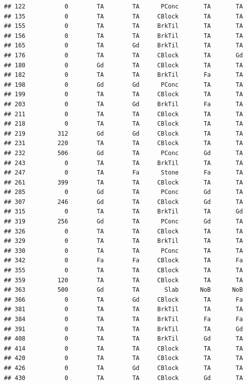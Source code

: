 \documentclass[]{article}
\begin{document}
\begin{verbatim}
## 122           0        TA        TA      PConc       TA       TA
## 135           0        TA        TA     CBlock       TA       TA
## 155           0        TA        TA     BrkTil       TA       TA
## 156           0        TA        TA     BrkTil       TA       TA
## 165           0        TA        Gd     BrkTil       TA       TA
## 176           0        TA        TA     CBlock       TA       Gd
## 180           0        Gd        TA     CBlock       TA       TA
## 182           0        TA        TA     BrkTil       Fa       TA
## 198           0        Gd        Gd      PConc       TA       TA
## 199           0        TA        TA     CBlock       TA       TA
## 203           0        TA        Gd     BrkTil       Fa       TA
## 211           0        TA        TA     CBlock       TA       TA
## 218           0        TA        TA     CBlock       TA       TA
## 219         312        Gd        Gd     CBlock       TA       TA
## 231         220        TA        TA     CBlock       TA       TA
## 232         506        Gd        TA      PConc       Gd       TA
## 243           0        TA        TA     BrkTil       TA       TA
## 247           0        TA        Fa      Stone       Fa       TA
## 261         399        TA        TA     CBlock       TA       TA
## 285           0        Gd        TA      PConc       Gd       TA
## 307         246        Gd        TA     CBlock       Gd       TA
## 315           0        TA        TA     BrkTil       TA       Gd
## 319         256        Gd        TA      PConc       Gd       TA
## 326           0        TA        TA     CBlock       TA       TA
## 329           0        TA        TA     BrkTil       TA       TA
## 330           0        TA        TA      PConc       TA       TA
## 342           0        Fa        Fa     CBlock       TA       Fa
## 355           0        TA        TA     CBlock       TA       TA
## 359         120        TA        TA     CBlock       TA       TA
## 363         500        Gd        TA       Slab      NoB      NoB
## 366           0        TA        Gd     CBlock       TA       Fa
## 381           0        TA        TA     BrkTil       TA       TA
## 384           0        TA        TA     BrkTil       Fa       Fa
## 391           0        TA        TA     BrkTil       TA       Gd
## 408           0        TA        TA     BrkTil       Gd       TA
## 414           0        TA        TA     CBlock       TA       TA
## 420           0        TA        TA     CBlock       TA       TA
## 426           0        TA        Gd     CBlock       TA       TA
## 430           0        TA        TA     CBlock       Gd       TA

\end{verbatim}
\end{document}
